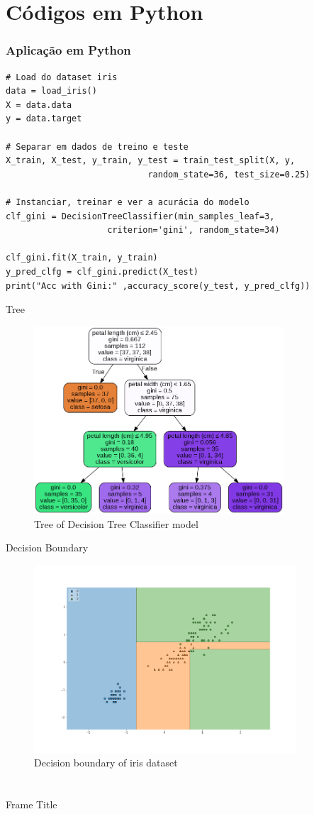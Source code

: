 \documentclass{beamer}
\begin{document}
\section{Códigos em Python}

\begin{frame}[fragile]
\frametitle{Aplicação em Python}
\begin{verbatim}
# Load do dataset iris
data = load_iris()
X = data.data
y = data.target

# Separar em dados de treino e teste
X_train, X_test, y_train, y_test = train_test_split(X, y,
                            random_state=36, test_size=0.25)

# Instanciar, treinar e ver a acurácia do modelo
clf_gini = DecisionTreeClassifier(min_samples_leaf=3,
                    criterion='gini', random_state=34)

clf_gini.fit(X_train, y_train)
y_pred_clfg = clf_gini.predict(X_test)
print("Acc with Gini:" ,accuracy_score(y_test, y_pred_clfg))
\end{verbatim}
\end{frame}

\begin{frame}{Tree}
\begin{figure}
\centering
    \includegraphics[height=7cm]{pic/decision_tree_graphivz.png}
    \caption{Tree of Decision Tree Classifier model}
\end{figure}
\end{frame}

\begin{frame}{Decision Boundary}
\begin{figure}
    \centering
    \includegraphics[height=7cm]{pic/decision_boundary.png}
    \caption{Decision boundary of iris dataset}
\end{figure}    
\end{frame}

\section{}
\begin{frame}{Frame Title}

\listoffigures    
\end{frame}
\end{document}
